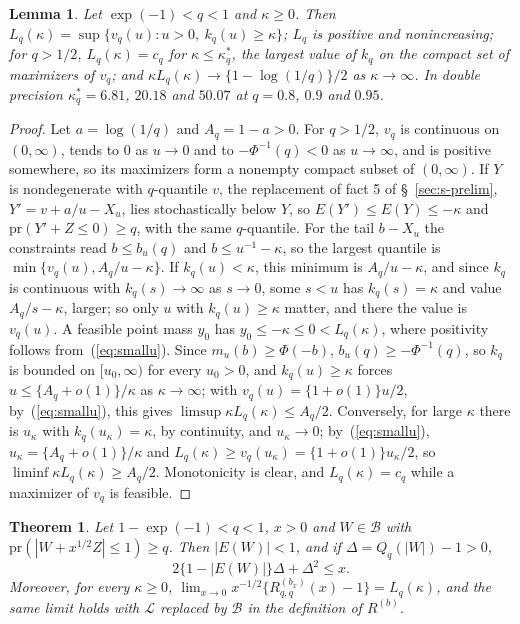 \documentclass[12pt]{article}
\renewcommand{\_}{\usc\allowbreak}
\newtheorem{theorem}{Theorem}
\newtheorem{lemma}{Lemma}
\theoremstyle{definition}
\numberwithin{equation}{section}
\newcommand{\pr}{\mathrm{pr}}
\newcommand{\LC}{\mathcal{L}}
\newcommand{\B}{\mathcal{B}}
\begin{document}
\begin{lemma}\label{lem:meanonesided}
Let $\exp(-1) < q < 1$ and $\kappa \ge 0$. Then $L_q(\kappa) = \sup\{v_q(u) : u > 0,\ k_q(u) \ge \kappa\}$; $L_q$ is positive and nonincreasing; for $q > 1/2$, $L_q(\kappa) = c_q$ for $\kappa \le \kappa^*_q$, the largest value of $k_q$ on the compact set of maximizers of $v_q$; and $\kappa L_q(\kappa) \to \{1 - \log(1/q)\}/2$ as $\kappa \to \infty$. In double precision $\kappa^*_q = 6.81$, $20.18$ and $50.07$ at $q = 0.8$, $0.9$ and $0.95$.
\end{lemma}

\begin{proof}
Let $a = \log(1/q)$ and $A_q = 1 - a > 0$. For $q > 1/2$, $v_q$ is continuous on $(0, \infty)$, tends to $0$ as $u \to 0$ and to $-\Phi^{-1}(q) < 0$ as $u \to \infty$, and is positive somewhere, so its maximizers form a nonempty compact subset of $(0, \infty)$. If $Y$ is nondegenerate with $q$-quantile $v$, the replacement of fact 5 of \S~\ref{sec:s-prelim}, $Y' = v + a/u - X_u$, lies stochastically below $Y$, so $E(Y') \le E(Y) \le -\kappa$ and $\pr(Y' + Z \le 0) \ge q$, with the same $q$-quantile. For the tail $b - X_u$ the constraints read $b \le b_u(q)$ and $b \le u^{-1} - \kappa$, so the largest quantile is $\min\{v_q(u), A_q/u - \kappa\}$. If $k_q(u) < \kappa$, this minimum is $A_q/u - \kappa$, and since $k_q$ is continuous with $k_q(s) \to \infty$ as $s \to 0$, some $s < u$ has $k_q(s) = \kappa$ and value $A_q/s - \kappa$, larger; so only $u$ with $k_q(u) \ge \kappa$ matter, and there the value is $v_q(u)$. A feasible point mass $y_0$ has $y_0 \le -\kappa \le 0 < L_q(\kappa)$, where positivity follows from~(\ref{eq:smallu}). Since $m_u(b) \ge \Phi(-b)$, $b_u(q) \ge -\Phi^{-1}(q)$, so $k_q$ is bounded on $[u_0, \infty)$ for every $u_0 > 0$, and $k_q(u) \ge \kappa$ forces $u \le \{A_q + o(1)\}/\kappa$ as $\kappa \to \infty$; with $v_q(u) = \{1 + o(1)\}u/2$, by~(\ref{eq:smallu}), this gives $\limsup\kappa L_q(\kappa) \le A_q/2$. Conversely, for large $\kappa$ there is $u_\kappa$ with $k_q(u_\kappa) = \kappa$, by continuity, and $u_\kappa \to 0$; by~(\ref{eq:smallu}), $u_\kappa = \{A_q + o(1)\}/\kappa$ and $L_q(\kappa) \ge v_q(u_\kappa) = \{1 + o(1)\}u_\kappa/2$, so $\liminf\kappa L_q(\kappa) \ge A_q/2$. Monotonicity is clear, and $L_q(\kappa) = c_q$ while a maximizer of $v_q$ is feasible.
\end{proof}

\begin{theorem}\label{thm:transition}
Let $1 - \exp(-1) < q < 1$, $x > 0$ and $W \in \B$ with $\pr(|W + x^{1/2}Z| \le 1) \ge q$. Then $|E(W)| < 1$, and if $\Delta = Q_q(|W|) - 1 > 0$,
\begin{equation}\label{eq:necessary}
2\{1 - |E(W)|\}\Delta + \Delta^2 \le x.
\end{equation}
Moreover, for every $\kappa \ge 0$, $\lim_{x\to0}x^{-1/2}\{R^{(b_x)}_{q,q}(x) - 1\} = L_q(\kappa)$, and the same limit holds with $\LC$ replaced by $\B$ in the definition of $R^{(b)}$.
\end{theorem}
\end{document}
